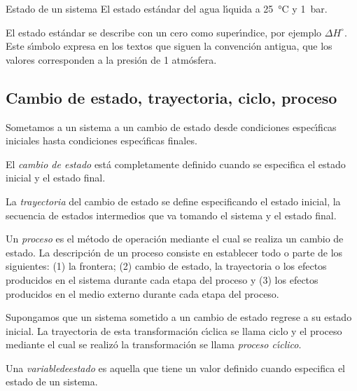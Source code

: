 \begin{ejemplo}{Estado de un sistema}
El estado est\'andar del agua l\'{\i}quida a \SI{25}{\celsius} y \SI{1}{\bar}\footnotemark.
\end{ejemplo}
 
 El estado est\'andar se describe con un cero como super\'{\i}ndice, por ejemplo $\Delta H^\circ$. Este s\'{\i}mbolo expresa en los textos que siguen la convenci\'on antigua, que los valores corresponden a  la presi\'on de 1 atm\'osfera.

\subsection{Cambio de estado, trayectoria, ciclo, proceso}

Sometamos a un sistema a un cambio de estado  desde
condiciones espec\'{\i}ficas iniciales hasta condiciones espec\'{\i}ficas finales.

El \textit{cambio de estado} est\'a completamente  definido cuando se especifica el estado inicial y el estado final.

La \textit{trayectoria}  del cambio de estado se define especificando el estado inicial, la secuencia de estados intermedios que va tomando el sistema y el estado final.

Un \textit{proceso}  es el m\'etodo de operaci\'on mediante el cual se realiza un cambio de estado. La descripci\'on de un proceso consiste en establecer todo o parte de los siguientes: (1) la frontera; (2) cambio de estado, la trayectoria o los efectos producidos en el sistema durante cada etapa del proceso y (3) los efectos producidos en el medio externo durante cada etapa del proceso.

Supongamos que un sistema sometido a un cambio de estado regrese a su estado inicial. La trayectoria de esta transformaci\'on c\'{\i}clica se llama ciclo y el proceso mediante el cual se realiz\'o la transformaci\'on se llama \textit{proceso c\'{\i}clico}.

Una \textit{\gls{variabledeestado}}  es aquella que tiene un
valor definido cuando especifica el estado de un sistema.

